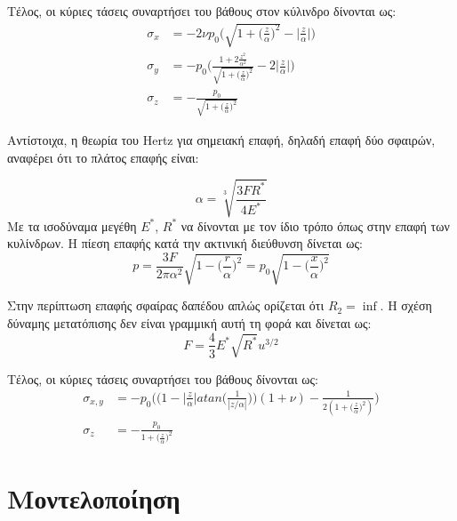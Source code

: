 \documentclass{article}
\begin{document}
Τέλος, οι κύριες τάσεις συναρτήσει του βάθους στον κύλινδρο δίνονται ως:
\begin{align}
    \sigma_x &= -2\nu p_0 \bigg(\sqrt{1 + \bigg(\frac{z}{\alpha}\bigg)^2} - \bigg|\frac{z}{\alpha}\bigg|\bigg)\\

    \sigma_y &= - p_0 \Bigg(\frac{1+2\frac{z^2}{\alpha^2}}{\sqrt{1 + \bigg(\frac{z}{\alpha}\bigg)^2}} - 2\bigg|\frac{z}{\alpha}\bigg|\Bigg)\\

    \sigma_z &= -\frac{p_0}{\sqrt{1 + \bigg(\frac{z}{\alpha}\bigg)^2}}
\end{align}



Αντίστοιχα, η θεωρία του Hertz για σημειακή επαφή, δηλαδή επαφή δύο σφαιρών,  αναφέρει ότι το πλάτος επαφής είναι:

\begin{equation}
    \alpha = \sqrt[3]{\frac{3 F R^*}{4 E^*}}
\end{equation}
Με τα ισοδύναμα μεγέθη $Ε^*$, $R^*$ να δίνονται με τον ίδιο τρόπο όπως στην επαφή των κυλίνδρων. Η πίεση επαφής κατά την ακτινική διεύθυνση δίνεται ως:
\begin{equation}
    p = \frac{3F}{2\pi \alpha^2} \sqrt{1 - \bigg(\frac{r}{\alpha}\bigg)^2} = p_0\sqrt{1 - \bigg(\frac{x}{\alpha}\bigg)^2}
\end{equation}

Στην περίπτωση επαφής σφαίρας δαπέδου απλώς ορίζεται ότι $R_2 = \inf$. Η σχέση δύναμης μετατόπισης δεν είναι γραμμική αυτή τη φορά και δίνεται ως:
\begin{equation}
    F = \frac{4}{3}E^* \sqrt{R^*} u^{3/2}
\end{equation}

Τέλος, οι κύριες τάσεις συναρτήσει του βάθους δίνονται ως:
\begin{align}
    \sigma_{x,y} &= - p_0 \bigg( \bigg(1-\bigg|\frac{z}{\alpha}\bigg| atan\bigg(\frac{1}{|z/\alpha|}\bigg)\bigg)(1+\nu)  - \frac{1}{2 (1 + \bigg(\frac{z}{\alpha}\bigg)^2)} \bigg)\\

    \sigma_z &= -\frac{p_0}{1 + \bigg(\frac{z}{\alpha}\bigg)^2}
\end{align}

\section{Μοντελοποίηση}
\end{document}
